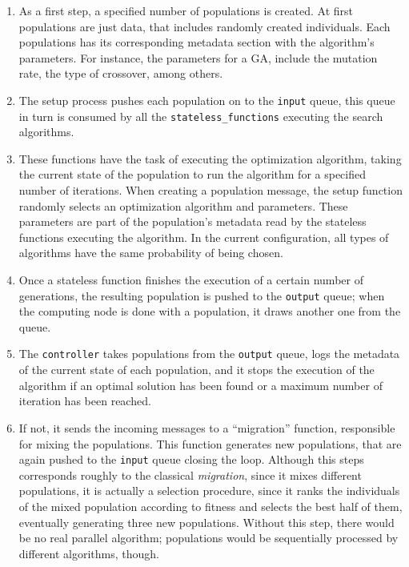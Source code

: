 \documentclass[runningheads]{llncs}
\begin{document}
\begin{enumerate}

\item As a first step, a specified number of populations is created. 
At first populations are just data, that includes randomly created individuals.
Each populations has its corresponding metadata section with the algorithm's parameters.
For instance, the parameters for a GA, include the mutation rate, the type of crossover, among others.

\item The setup process pushes each population on to the \texttt{input}
queue, this queue in turn is consumed by all the \texttt{stateless\_functions} executing 
the search algorithms.

\item These functions have the task of executing the optimization algorithm, taking the 
current state of the population to run the algorithm for a specified number of
iterations. When creating a population message, the setup function randomly
selects an optimization algorithm and parameters. These parameters
are part of the population's metadata read by the stateless
functions executing the algorithm. In the current configuration, all
types of algorithms have the same probability of being chosen.

\item Once a stateless function finishes the execution of a certain number of
  generations, the resulting population is pushed to 
the \texttt{output} queue; when the computing node is done with a population, it draws another one from the
queue.

\item The \texttt{controller} takes populations from the \texttt{output} queue,
logs the metadata of the current state of each population, and it stops the execution
of the algorithm if an optimal solution has been found or a maximum number of iteration
has been reached.

\item If not, it sends the incoming messages to a ``migration'' function,
  responsible for mixing the populations. This function generates new populations,
  that are again pushed to the \texttt{input} queue closing the loop.
  Although this steps corresponds roughly to the classical
{\em migration}, since it mixes different populations, it is actually
a selection procedure, since it ranks the individuals of the mixed
population according to fitness and selects the best half of them,
eventually generating three new populations. Without this step, there
would be no real parallel algorithm; populations would be sequentially
processed by different algorithms, though.

\end{enumerate}
\end{document}
